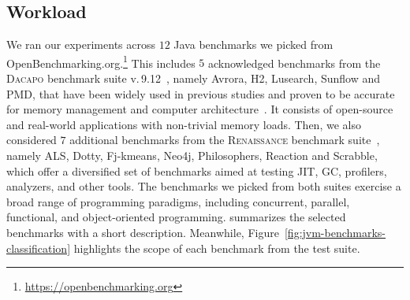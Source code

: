 \subsection{Workload}
We ran our experiments across $12$ Java benchmarks we picked from \textsf{OpenBenchmarking.org}.\footnote{\url{https://openbenchmarking.org}}
This includes $5$ acknowledged benchmarks from the \textsc{Dacapo} benchmark suite v.\,9.12~\cite{DaCapo:paper}, namely \textsf{Avrora}, \textsf{H2}, \textsf{Lusearch}, \textsf{Sunflow} and \textsf{PMD}, that have been widely used in previous studies and proven to be accurate for memory management and computer architecture~\cite{DBLP:conf/wosp/LengauerBMW17,DBLP:conf/oopsla/KaliberaMJV12}.
It consists of open-source and real-world applications with non-trivial memory loads.
% 
Then, we also considered $7$ additional benchmarks from the \textsc{Renaissance} benchmark suite~\cite{renaissance,DBLP:conf/pldi/ProkopecRLD0SBZ19}, namely \textsf{ALS}, \textsf{Dotty}, \textsf{Fj-kmeans}, \textsf{Neo4j}, \textsf{Philosophers}, \textsf{Reaction} and \textsf{Scrabble}, which offer a diversified set of benchmarks aimed at testing JIT, GC, profilers, analyzers, and other tools.
The benchmarks we picked from both suites exercise a broad range of programming paradigms, including concurrent, parallel, functional, and object-oriented programming.
 summarizes the selected benchmarks with a short description. Meanwhile, Figure~\ref{fig:jvm-benchmarks-classification} highlights the scope of each benchmark from the test suite.


